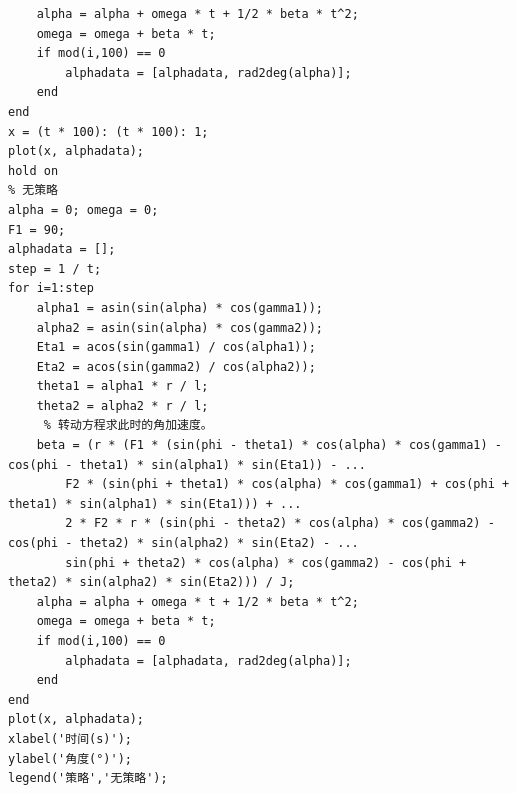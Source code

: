 \documentclass{cumcm}
\begin{document}
\begin{lstlisting}
    alpha = alpha + omega * t + 1/2 * beta * t^2;
    omega = omega + beta * t;
    if mod(i,100) == 0
        alphadata = [alphadata, rad2deg(alpha)];
    end
end
x = (t * 100): (t * 100): 1;
plot(x, alphadata);
hold on 
% 无策略
alpha = 0; omega = 0;
F1 = 90;
alphadata = [];
step = 1 / t;
for i=1:step
    alpha1 = asin(sin(alpha) * cos(gamma1));
    alpha2 = asin(sin(alpha) * cos(gamma2));
    Eta1 = acos(sin(gamma1) / cos(alpha1));
    Eta2 = acos(sin(gamma2) / cos(alpha2));
    theta1 = alpha1 * r / l;
    theta2 = alpha2 * r / l;
     % 转动方程求此时的角加速度。
    beta = (r * (F1 * (sin(phi - theta1) * cos(alpha) * cos(gamma1) - cos(phi - theta1) * sin(alpha1) * sin(Eta1)) - ...
        F2 * (sin(phi + theta1) * cos(alpha) * cos(gamma1) + cos(phi + theta1) * sin(alpha1) * sin(Eta1))) + ...
        2 * F2 * r * (sin(phi - theta2) * cos(alpha) * cos(gamma2) - cos(phi - theta2) * sin(alpha2) * sin(Eta2) - ...
        sin(phi + theta2) * cos(alpha) * cos(gamma2) - cos(phi + theta2) * sin(alpha2) * sin(Eta2))) / J;
    alpha = alpha + omega * t + 1/2 * beta * t^2;
    omega = omega + beta * t;
    if mod(i,100) == 0
        alphadata = [alphadata, rad2deg(alpha)];
    end
end
plot(x, alphadata);
xlabel('时间(s)');
ylabel('角度(°)');
legend('策略','无策略');
\end{lstlisting}
\end{document}
